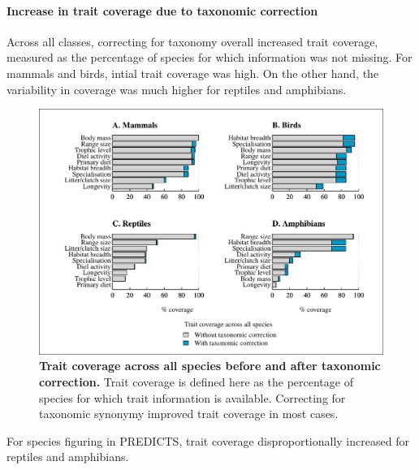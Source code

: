 
\paragraph{Increase in trait coverage due to taxonomic correction}
Across all classes, correcting for taxonomy overall increased trait coverage, measured as the percentage of species for which information was not missing. For mammals and birds, intial trait coverage was high. On the other hand, the variability in coverage was much higher for reptiles and amphibians.

\begin{figure}[h!]
\centering
\includegraphics[scale=0.85]{figures/chapter2/Target_traits_All_species_coverage}
\caption[Trait coverage across all species before and after taxonomic correction]{\textbf{Trait coverage across all species before and after taxonomic correction.} Trait coverage is defined here as the percentage of species for which trait information is available. Correcting for taxonomic synonymy improved trait coverage in most cases.}
\end{figure}

For species figuring in PREDICTS, trait coverage disproportionally increased for reptiles and amphibians.


